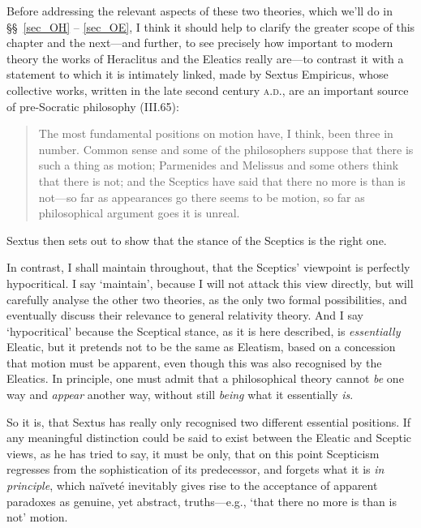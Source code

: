 Before addressing the relevant aspects of these two theories, which we'll do in \S\S~\ref{sec_OH} -- \ref{sec_OE}, I think it should help to clarify the greater scope of this chapter and the next---and further, to see precisely how important to modern theory the works of Heraclitus and the Eleatics really are---to contrast it with a statement to which it is intimately linked, made by Sextus Empiricus, whose collective works, written in the late second century \textsc{a.d.}, are an important source of pre-Socratic philosophy \cite{Sextus2000} (III.65):
\begin{quotation}
The most fundamental positions on motion have, I think, been three in number. Common sense and some of the philosophers suppose that there is such a thing as motion; Parmenides and Melissus and some others think that there is not; and the Sceptics have said that there no more is than is not---so far as appearances go there seems to be motion, so far as philosophical argument goes it is unreal.
\end{quotation}
Sextus then sets out to show that the stance of the Sceptics is the right one.

In contrast, I shall maintain throughout, that the Sceptics' viewpoint is perfectly hypocritical. I say `maintain', because I will not attack this view directly, but will carefully analyse the other two theories, as the only two formal possibilities, and eventually discuss their relevance to general relativity theory. And I say `hypocritical' because the Sceptical stance, as it is here described, is \textit{essentially} Eleatic, but it pretends not to be the same as Eleatism, based on a concession that motion must be apparent, even though this was also recognised by the Eleatics. In principle, one must admit that a philosophical theory cannot \textit{be} one way and \textit{appear} another way, without still \textit{being} what it essentially \textit{is}.

So it is, that Sextus has really only recognised two different essential positions. If any meaningful distinction could be said to exist between the Eleatic and Sceptic views, as he has tried to say, it must be only, that on this point Scepticism regresses from the sophistication of its predecessor, and forgets what it is \textit{in principle}, which na\"{i}vet\'{e} inevitably gives rise to the acceptance of apparent paradoxes as genuine, yet abstract, truths---e.g., `that there no more is than is not' motion.

